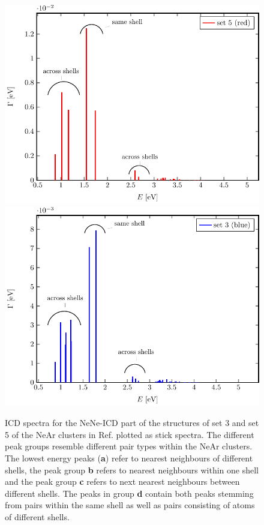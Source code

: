 \label{sec:near}
\begin{figure}[h]
 \centering
 \includegraphics[width=\columnwidth]{pics/rot.pdf}\\
 \includegraphics[width=\columnwidth]{pics/blue.pdf}
 \caption{ICD spectra for the NeNe-ICD part of the structures of set 3 and
          set 5 of the NeAr clusters in Ref. \cite{Fasshauer14_1}
          plotted as stick spectra.
          The different peak groups resemble different pair types
          within the NeAr clusters. The lowest energy peaks (\textbf{a})
          refer to nearest neighbours
          of different shells, the peak group \textbf{b} refers
          to nearest neighbours within one shell and the peak group \textbf{c}
          refers to next nearest neighbours between different shells.
          The peaks in group \textbf{d} contain both peaks stemming from
          pairs within the same shell as well as pairs consisting of atoms
          of different shells.}
 \label{figure:rot_blue}
\end{figure}

